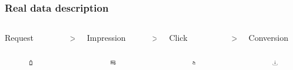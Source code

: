 \documentclass[intlimits, 9pt, unicode]{beamer}
\begin{document}
\begin{frame}
\frametitle{Real data description}

   \begin{columns}
    \begin{column}{0.25\textwidth}
    \centering
     Request  
     \begin{figure}
	\includegraphics[height=1cm]{images/scheme_request}
     \end{figure}
     \end{column}
    \begin{column}{0.001\textwidth}
    \centering
	>
     \end{column}
    \begin{column}{0.25\textwidth}
    \centering
    Impression  
     \begin{figure}
	\includegraphics[height=1cm]{images/scheme_impression}
     \end{figure}
    \end{column}
    \begin{column}{0.001\textwidth}
    \centering
    >
    \end{column}
    \begin{column}{0.25\textwidth}
    \centering
    Click
     \begin{figure}
	\includegraphics[height=1cm]{images/scheme_click}
     \end{figure}
    \end{column}
    \begin{column}{0.001\textwidth}
    \centering
    >
    \end{column}
    \begin{column}{0.25\textwidth}
    \centering
     Conversion
     \begin{figure}
	\includegraphics[height=1cm]{images/scheme_conversion}
     \end{figure}     
     \end{column}
     \end{columns}


\end{frame}
\end{document}
